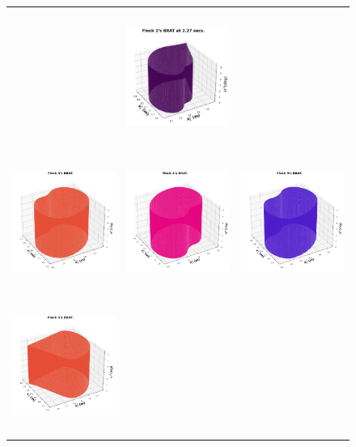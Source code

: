 \begin{figure}[tb!]
\begin{tabular}{ccc}
		& 		
		\includegraphics[height=12em,width=10em]{figures/flock_2_final.jpg} 		\\
		\includegraphics[height=12em,width=10em]{figures/flock_3_init.jpg} 
		&
		\includegraphics[height=12em,width=10em]{figures/flock_4_init.jpg} 
		& 		
		\includegraphics[height=12em,width=10em]{figures/flock_5_init.jpg} 
		\\
		\includegraphics[height=12em,width=10em]{figures/flock_3_final.jpg} 

\end{tabular}
\end{figure}
